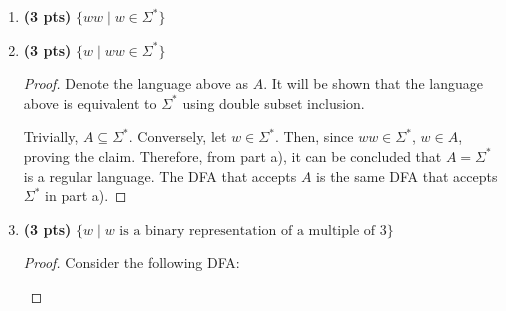 \documentclass[11pt]{article}
\begin{document}
\begin{enumerate}[label=\textbf{Q\arabic*.}]
\begin{enumerate}[label=\textit{\alph*)}]
	\begin{proof}
		This is not regular. Suppose for contradiction that this language was regular. Then there would be a DFA associated with this language. Let \(q\) be the number of states in this DFA, and let \(q_0\) denote the initial state. Define the following strings:
		\[
			w_i = 0^q 1 0^{i} \text{, for } i \in \{0, 1, 2, ..., q\}
		\]
		Notice that there are \(q+1\) strings in total. By the pigeonhole principle, at least 2 \(w_i, w_j\) will be in the same state \(q_c\), \(i < j\), that is, \(\delta (q_0, w_i) = \delta (q_0, w_j) = q_c\). It follows that \(\delta (q_0, w_i 0^{q-i}) = \delta (q_0, w_j 0^{q-i})\). But notice that
		\[
			w_i = 0^q 1 0^q \text{ and } w_j = 0^q 1 0^{q+j-i} \text{.} 
		\]
		It can be seen that \(w_i\) is a palindrome and should be accepted, but because \(q + j - i \neq q\), \(w_j\) is not a palindrome, which contradicts the fact that \(w_i\) and \(w_j\) are in the same state.

	\end{proof}
	\item \textbf{(3 pts)} $ \{ww \mid w \in \Sigma^*  \} $
	\item \textbf{(3 pts)} $ \{w \mid ww \in \Sigma^*  \} $

	\begin{proof}
		Denote the language above as \(A\). It will be shown that the language above is equivalent to \(\Sigma ^*\) using double subset inclusion.

		Trivially, \(A \subseteq \Sigma ^*\). Conversely, let \(w \in \Sigma ^*\). Then, since \(ww \in \Sigma ^*\), \(w \in A\), proving the claim. Therefore, from part a), it can be concluded that \(A = \Sigma ^*\) is a regular language. The DFA that accepts \(A\) is the same DFA that accepts \(\Sigma ^*\) in part a).

	\end{proof}
	\item \textbf{(3 pts)} $ \{w \mid w \text{ is a binary representation of a multiple of 3}\} $
	
	\begin{proof}
		Consider the following DFA:

		\begin{center}
		\end{center}


\end{proof}
\end{enumerate}
\end{enumerate}
\end{document}
